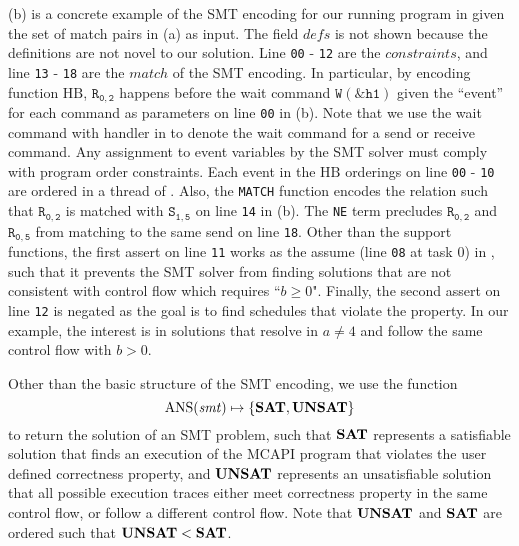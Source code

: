 (b) is a concrete example of the SMT encoding for our running program in  given the set of match pairs in (a) as input. The field $\mathit{defs}$ is not shown because the definitions are not novel to our solution. Line \texttt{00} - \texttt{12} are the $\mathit{constraints}$, and line \texttt{13} - \texttt{18} are the $\mathit{match}$ of the SMT encoding. In particular, by encoding function $\mathrm{HB}$, $\mathtt{R_{0,2}}$ happens before the wait command $\mathtt{W(\&h1)}$ given the ``event'' for each command as parameters on line \texttt{00} in (b). Note that we use the wait command with handler in  to denote the wait command for a send or receive command. Any assignment to event variables by the SMT solver must comply with program order constraints. Each event in the $\mathrm{HB}$ orderings on line \texttt{00} - \texttt{10} are ordered in a thread of . Also, the \texttt{MATCH} function encodes the relation such that $\mathtt{R_{0,2}}$ is matched with $\mathtt{S_{1,5}}$ on line \texttt{14} in (b). The \texttt{NE} term precludes $\mathtt{R_{0,2}}$ and $\mathtt{R_{0,5}}$ from matching to the same send on line \texttt{18}. Other than the support functions, the first assert on line \texttt{11} works as the assume (line \texttt{08} at task 0) in , such that it prevents the SMT solver from finding solutions that are not consistent with control flow which requires ``$b \ge 0$". Finally, the second assert on line \texttt{12} is negated as the goal is to find schedules that violate the property. In our example, the interest is in solutions that resolve in $a \neq 4$ and follow the same control flow with $b > 0$.

Other than the basic structure of the SMT encoding, we use the function
\[\mathrm{ANS}(\mathit{smt}) \mapsto \{\mathrm{\textbf{SAT}},\mathrm{\textbf{UNSAT}}\} \]
to return the solution of an SMT problem, such that $\mathrm{\textbf{SAT}}$ represents a satisfiable solution that finds an execution of the MCAPI program that violates the user defined correctness property, and $\mathrm{\textbf{UNSAT}}$ represents an unsatisfiable solution that all possible execution traces either meet correctness property in the same control flow, or follow a different control flow. Note that $\mathrm{\textbf{UNSAT}}$ and $\mathrm{\textbf{SAT}}$ are ordered such that $\mathrm{\textbf{UNSAT}} < \mathrm{\textbf{SAT}}$.

